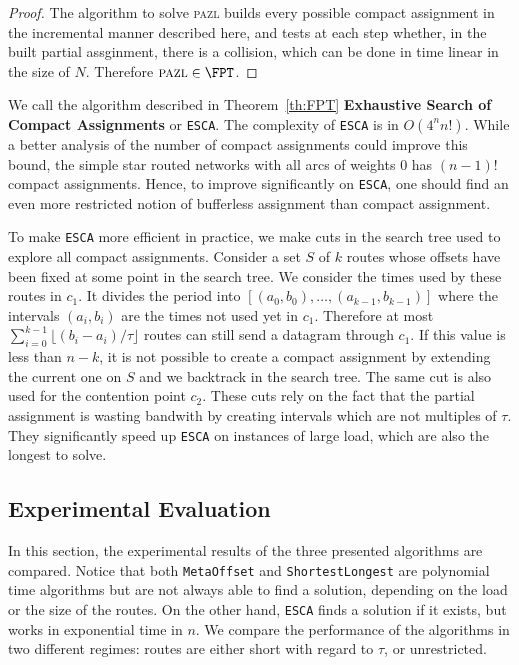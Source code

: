 \documentclass[a4paper,10pt]{journal}
\newcommand\shortestlongest{\texttt{ShortestLongest}\xspace}
\newcommand\metaoffset{\texttt{MetaOffset}\xspace}
\newcommand\ESCA{\texttt{ESCA}\xspace}
\newcommand\pazl{\textsc{pazl}\xspace}
\begin{document}
\begin{proof}
The algorithm to solve \pazl builds every possible compact assignment in the incremental manner described here, and tests at each step whether, in the built partial assginment, there is a collision, which can be done in time linear in the size of $N$. Therefore $\pazl \in \FPT$.
\end{proof}


We call the algorithm described in Theorem~\ref{th:FPT} \textbf{Exhaustive Search of Compact Assignments}
or \ESCA. The complexity of \ESCA is in $O(4^n n!)$. While a better analysis
of the number of compact assignments could improve this bound, the simple star routed networks with all arcs of weights $0$ has $(n-1)!$ compact assignments. Hence, to improve significantly on \ESCA, one should find an even more restricted notion of bufferless assignment than compact assignment.

To make \ESCA more efficient in practice, we make cuts in the search tree used to explore all compact assignments. Consider a set $S$ of $k$ routes whose offsets have been fixed at some point in the search tree. We consider the times used by these routes in $c_1$. It divides the period into $[(a_0,b_0), \dots, (a_{k-1},b_{k-1})]$ where the intervals $(a_i,b_i)$ are the times not used yet in $c_1$. Therefore at most $\displaystyle{ \sum_{i=0}^{k-1} \lfloor(b_{i} -a_i)/\tau\rfloor}$ routes can still send a datagram through $c_1$. If this value is less than $n - k$, it is not possible to create a compact assignment by extending the current one on $S$ and we backtrack in the search tree. The same cut is also used for the contention point $c_2$. These cuts rely on the fact that the partial assignment is wasting bandwith by creating intervals which are not multiples of $\tau$. They significantly speed up \ESCA on instances of large load, which are also the longest to solve.



   \subsection{Experimental Evaluation}\label{sec:exp_PAZL}

   
  In this section, the experimental results of the three presented algorithms are compared.
   Notice that both \metaoffset and \shortestlongest are polynomial time algorithms but are not always able to find a solution, depending on the load or the size of the routes. On the other hand, \ESCA finds a solution if it exists, but works in exponential time in $n$. We compare the performance of the algorithms in two different regimes: routes are either short with regard to $\tau$, or unrestricted.
\end{document}
